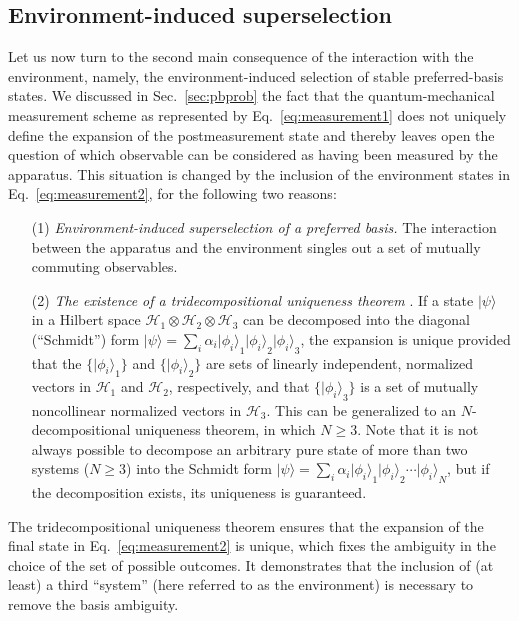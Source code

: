 \documentclass[rmp,aps,amsmath,amsfonts,noshowkeys,noshowpacs,12pt]{revtex4}
\newcommand{\ket}[1]{\ensuremath{|{#1\rangle}}}
\begin{document}
\subsection{Environment-induced superselection \label{sec:einsel}}

Let us now turn to the second main consequence of the interaction with
the environment, namely, the environment-induced selection of stable
preferred-basis states.  We discussed in Sec.~\ref{sec:pbprob} the
fact that the quantum-mechanical measurement scheme as represented by
Eq.~\eqref{eq:measurement1} does not uniquely define the expansion of
the postmeasurement state and thereby leaves open the question of
which observable can be considered as having been measured by the
apparatus.  This situation is changed by the inclusion of the
environment states in Eq.~\eqref{eq:measurement2}, for the following
two reasons:

\begin{enumerate} 

\item[(1)] {\em Environment-induced superselection of a preferred basis.}
  The interaction between the apparatus and the environment singles
  out a set of mutually commuting observables.
  
\item[(2)] {\em The existence of a tridecompositional uniqueness
    theorem} \citep{Elby:1994:tz,Clifton:1995:po,Bub:1997:iq}. If a
  state $\ket{\psi}$ in a Hilbert space $\mathcal{H}_1 \otimes
  \mathcal{H}_2 \otimes \mathcal{H}_3$ can be decomposed into the
  diagonal (``Schmidt'') form $\ket{\psi} = \sum_i \alpha_i
  \ket{\phi_i}_1 \ket{\phi_i}_2 \ket{\phi_i}_3$, the expansion is
  unique provided that the $\{ \ket{\phi_i}_1 \}$ and $\{
  \ket{\phi_i}_2 \}$ are sets of linearly independent, normalized
  vectors in $\mathcal{H}_1$ and $\mathcal{H}_2$, respectively, and
  that $\{ \ket{\phi_i}_3 \}$ is a set of mutually noncollinear
  normalized vectors in $\mathcal{H}_3$.  This can be generalized to
  an $N$-decompositional uniqueness theorem, in which $N \ge 3$.  Note
  that it is not always possible to decompose an arbitrary pure state
  of more than two systems ($N \ge 3$) into the Schmidt form
  $\ket{\psi} = \sum_i \alpha_i \ket{\phi_i}_1 \ket{\phi_i}_2 \cdots
  \ket{\phi_i}_N$, but if the decomposition exists, its uniqueness is
  guaranteed.

\end{enumerate}

The tridecompositional uniqueness theorem ensures that the expansion
of the final state in Eq.~\eqref{eq:measurement2} is unique, which
fixes the ambiguity in the choice of the set of possible outcomes. It
demonstrates that the inclusion of (at least) a third ``system'' (here
referred to as the environment) is necessary to remove the basis
ambiguity.
\end{document}
